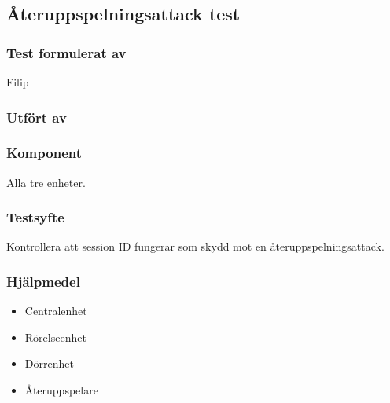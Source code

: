 \clearpage
\subsection{Återuppspelningsattack test}
\label{test:sessionID}

\setlength{\columnsep}{1cm}




\begin{multicols}{2}
\subsubsection*{Test formulerat av}
Filip

\subsubsection*{Utfört av}



\end{multicols}
\subsubsection*{Komponent}
Alla tre enheter.


\subsubsection*{Testsyfte}
Kontrollera att session ID fungerar som skydd mot en återuppspelningsattack.


\subsubsection*{Hjälpmedel}
\begin{itemize}
	\item Centralenhet
	\item Rörelseenhet
	\item Dörrenhet
	\item Återuppspelare
\end{itemize}




